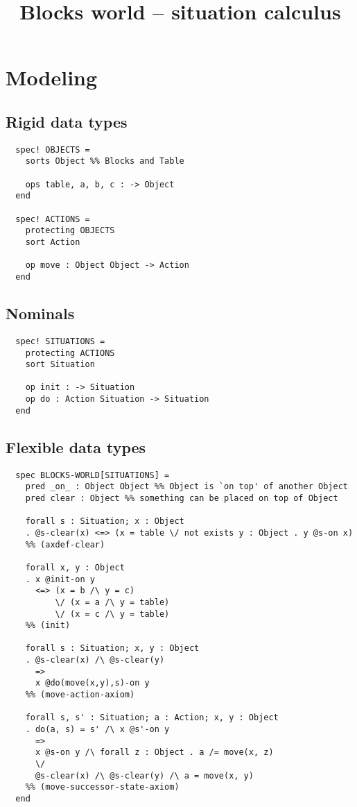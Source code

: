 



\title{Blocks world  -- situation calculus}
\maketitle

\section{Modeling}

\subsection{Rigid data types}

\begin{lstlisting}
  spec! OBJECTS =
    sorts Object %% Blocks and Table

    ops table, a, b, c : -> Object
  end
  
  spec! ACTIONS =
    protecting OBJECTS
    sort Action

    op move : Object Object -> Action
  end
\end{lstlisting}

\subsection{Nominals}

\begin{lstlisting}
  spec! SITUATIONS =
    protecting ACTIONS
    sort Situation

    op init : -> Situation
    op do : Action Situation -> Situation
  end
\end{lstlisting}

\subsection{Flexible data types}

\begin{lstlisting}
  spec BLOCKS-WORLD[SITUATIONS] =
    pred _on_ : Object Object %% Object is `on top' of another Object
    pred clear : Object %% something can be placed on top of Object

    forall s : Situation; x : Object
    . @s-clear(x) <=> (x = table \/ not exists y : Object . y @s-on x)
    %% (axdef-clear)
    
    forall x, y : Object
    . x @init-on y
      <=> (x = b /\ y = c)
          \/ (x = a /\ y = table)
          \/ (x = c /\ y = table)
    %% (init)

    forall s : Situation; x, y : Object
    . @s-clear(x) /\ @s-clear(y)
      =>
      x @do(move(x,y),s)-on y
    %% (move-action-axiom)
      
    forall s, s' : Situation; a : Action; x, y : Object
    . do(a, s) = s' /\ x @s'-on y
      =>
      x @s-on y /\ forall z : Object . a /= move(x, z)
      \/
      @s-clear(x) /\ @s-clear(y) /\ a = move(x, y)
    %% (move-successor-state-axiom) 
  end
\end{lstlisting}

